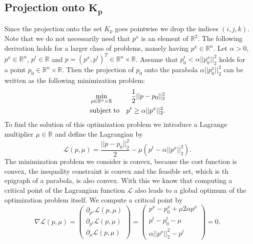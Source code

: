 \documentclass[abstracton]{scrreprt}
\begin{document}

        \subsection{Projection onto $\boldsymbol{K_{p}}$}
            Since the projection onto the set $K_{p}$ goes pointwise we drop the indices $(i, j, k)$. Note that we do not necessarily need that $p^{x}$ is an element of $\mathbb{R}^{2}$. The following derivation holds for a larger class of problems, namely having $p^{x} \in \mathbb{R}^{n}$. Let $\alpha > 0$, $p^{x} \in \mathbb{R}^{n}$, $p^{t} \in \mathbb{R}$ and $p = (p^{x}, p^{t})^{T} \in \mathbb{R}^{n} \times \mathbb{R}$. Assume that $p_{0}^{t} < \alpha ||p_{0}^{x}||_{2}^{2}$ holds for a point $p_{0} \in \mathbb{R}^{n}\times\mathbb{R}$. Then the projection of $p_{0}$ onto the parabola $\alpha ||p_{0}^{x}||_{2}^{2}$ can be written as the following minimization problem:
                \begin{eqnarray}
                    &\min\limits_{p \in \mathbb{R}^{n} \times \mathbb{R}}& \frac{1}{2} ||p - p_{0}||_{2}^{2} \notag \\
                    &\textnormal{subject to}& p^{t} \ge \alpha||p^{x}||_{2}^{2}. \notag
                \end{eqnarray}
            To find the solution of this optimization problem we introduce a Lagrange multiplier $\mu \in \mathbb{R}$ and define the Lagrangian by
                $$
                    \mathcal{L}(p, \mu) = \frac{||p - p_{0}||_{2}^{2}}{2} - \mu \left( p^{t} - \alpha||p^{x}||_{2}^{2} \right).
                $$
            The minimization problem we consider is convex, because the cost function is convex, the inequality constraint is convex and the feasible set, which is th epigraph of a parabola, is also convex. With this we know that computing a critical point of the Lagrangian function $\mathcal{L}$ also leads to a global optimum of the optimization problem itself. We compute a critical point by
                \begin{equation}
                    \nabla \mathcal{L}(p, \mu) =
                    \begin{pmatrix}
                        \partial_{p^{x}} \mathcal{L}(p, \mu) \\
                        \partial_{p^{t}} \mathcal{L}(p, \mu) \\
                        \partial_{\mu} \mathcal{L}(p, \mu)
                    \end{pmatrix} = 
                    \begin{pmatrix}
                        p^{x} - p_{0}^{x} + \mu 2 \alpha p^{x} \\
                        p^{t} - p_{0}^{t} - \mu \\
                        \alpha||p^{x}||_{2}^{2} - p^{t}
                    \end{pmatrix}
                    = 0. \label{eq:linearSystem}
                \end{equation}
\end{document}
